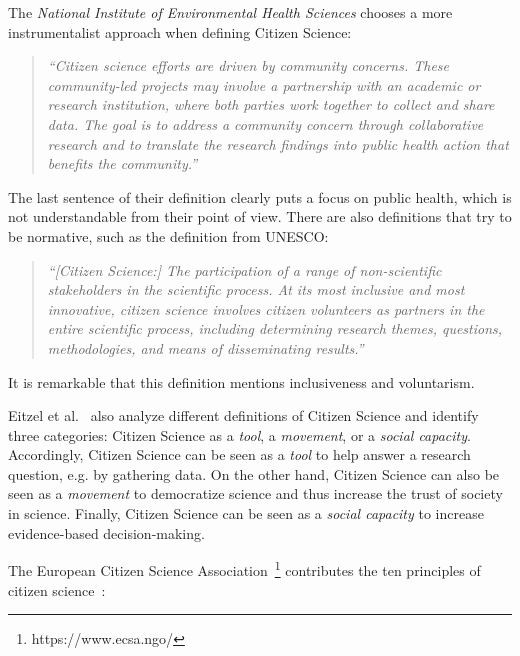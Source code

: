The \textit{National Institute of Environmental Health Sciences} chooses a more instrumentalist approach when defining Citizen Science:
\begin{quotation}
\textit{``Citizen science efforts are driven by community concerns. These community-led projects may involve a partnership with an academic or research institution, where both parties work together to collect and share data. The goal is to address a community concern through collaborative research and to translate the research findings into public health action that benefits the community.''}~\cite{national2022community}
\end{quotation}
The last sentence of their definition clearly puts a focus on public health, which is not understandable from their point of view.
There are also definitions that try to be normative, such as the definition from UNESCO:
\begin{quotation}
\textit{``[Citizen Science:] The participation of a range of non-scientific stakeholders in the scientific process. At its most inclusive and most innovative, citizen science involves citizen volunteers as partners in the entire scientific process, including determining research themes, questions, methodologies, and means of disseminating results.''}~\cite{vohland2021science}
\end{quotation}
It is remarkable that this definition mentions inclusiveness and voluntarism.

Eitzel et al.~\cite{eitzel2017citizen} also analyze different definitions of Citizen Science and identify three categories: Citizen Science as a \textit{tool}, a \textit{movement}, or a \textit{social capacity}.
Accordingly, Citizen Science can be seen as a \textit{tool} to help answer a research question, e.g. by gathering data.
On the other hand, Citizen Science can also be seen as a \textit{movement} to democratize science and thus increase the trust of society in science.
Finally, Citizen Science can be seen as a \textit{social capacity} to increase evidence-based decision-making.

The European Citizen Science Association~\footnote{https://www.ecsa.ngo/} contributes the ten principles of citizen science~\cite{ecsa2015ten}:

